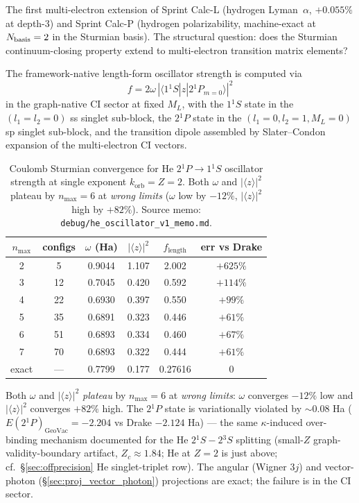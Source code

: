 \documentclass[11pt]{article}
\begin{document}
The first multi-electron extension of Sprint Calc-L (hydrogen Lyman~$\alpha$,
$+0.055\%$ at depth-3) and Sprint Calc-P (hydrogen polarizability,
machine-exact at $N_{\rm basis}=2$ in the Sturmian basis).  The
structural question: does the Sturmian continuum-closing property
extend to multi-electron transition matrix elements?

The framework-native length-form oscillator strength is computed via
\[
f = 2\omega\, |\langle 1{}^1\!S | z | 2{}^1\!P_{m=0}\rangle|^2
\]
in the graph-native CI sector at fixed $M_L$, with the $1{}^1\!S$ state in
the $(l_1=l_2=0)$ ss singlet sub-block, the $2{}^1\!P$ state in the
$(l_1=0, l_2=1, M_L=0)$ sp singlet sub-block, and the transition dipole
assembled by Slater--Condon expansion of the multi-electron CI vectors.

\begin{table}[h]
\centering\small
\begin{tabular}{c c c c c c}
\toprule
$n_{\max}$ & configs & $\omega$ (Ha) & $|\langle z\rangle|^2$ & $f_\text{length}$ & err vs Drake \\
\midrule
2 & 5 & 0.9044 & 1.107 & 2.002 & $+625\%$ \\
3 & 12 & 0.7045 & 0.420 & 0.592 & $+114\%$ \\
4 & 22 & 0.6930 & 0.397 & 0.550 & $+99\%$ \\
5 & 35 & 0.6891 & 0.323 & 0.446 & $+61\%$ \\
6 & 51 & 0.6893 & 0.334 & 0.460 & $+67\%$ \\
7 & 70 & 0.6893 & 0.322 & 0.444 & $+61\%$ \\
\midrule
exact & --- & 0.7799 & 0.177 & 0.27616 & 0 \\
\bottomrule
\end{tabular}
\caption{Coulomb Sturmian convergence for He $2{}^1P \to 1{}^1S$
oscillator strength at single exponent $k_\text{orb} = Z = 2$.  Both
$\omega$ and $|\langle z\rangle|^2$ plateau by $n_{\max} = 6$ at
\emph{wrong limits} ($\omega$ low by $-12\%$, $|\langle z\rangle|^2$
high by $+82\%$).  Source memo:
\texttt{debug/he\_oscillator\_v1\_memo.md}.}
\label{tab:autopsy_he_oscillator}
\end{table}

Both $\omega$ and $|\langle z\rangle|^2$ \emph{plateau} by $n_{\max} = 6$ at
\emph{wrong limits}: $\omega$ converges $-12\%$ low and $|\langle z\rangle|^2$
converges $+82\%$ high.  The $2{}^1\!P$ state is variationally violated by
$\sim 0.08$ Ha ($E(2{}^1\!P)_\text{GeoVac} = -2.204$ vs Drake $-2.124$ Ha) ---
the same $\kappa$-induced over-binding mechanism documented for
the He $2{}^1\!S - 2{}^3\!S$ splitting (small-$Z$
graph-validity-boundary artifact, $Z_c \approx 1.84$; He at $Z = 2$
is just above; cf.\ \S\ref{sec:offprecision} He singlet-triplet row).
The angular (Wigner $3j$) and vector-photon
(\S\ref{sec:proj_vector_photon}) projections are exact; the failure
is in the CI sector.
\end{document}
